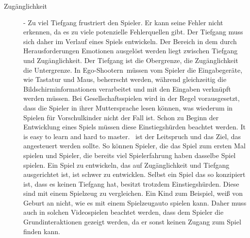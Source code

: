 \begin{description}
\item[Zugänglichkeit] - Zu viel Tiefgang frustriert den Spieler. Er kann seine Fehler nicht erkennen, da es zu viele potenzielle Fehlerquellen gibt. Der Tiefgang muss sich daher im Verlauf eines Spiels entwickeln. Der Bereich in dem durch Herausforderungen Emotionen ausgelöst werden liegt zwischen Tiefgang und Zugänglichkeit. Der Tiefgang ist die Obergrenze, die Zugänglichkeit die Untergrenze. In \glqq Ego-Shootern\grqq\ müssen vom Spieler die Eingabegeräte, wie Tastatur und Maus, beherrscht werden, während gleichzeitig die Bildschirminformationen verarbeitet und mit den Eingaben verknüpft werden müssen. Bei Gesellschaftsspielen wird in der Regel vorausgesetzt, dass die Spieler in ihrer Muttersprache lesen können, was wiederum in Spielen für Vorschulkinder nicht der Fall ist. Schon zu Beginn der Entwicklung eines Spiels müssen diese Einstiegshürden beachtet werden. \glqq It is easy to learn and hard to master.\grqq\ \cite[S. 66]{Adams:1515529} ist der Leitspruch und das Ziel, das angesteuert werden sollte. So können Spieler, die das Spiel zum ersten Mal spielen und Spieler, die bereits viel Spielerfahrung haben dasselbe Spiel spielen. Ein Spiel zu entwickeln, das auf Zugänglichkeit und Tiefgang ausgerichtet ist, ist schwer zu entwicklen.  \cite[S. 66 f.]{Adams:1515529}
Selbst ein Spiel das so konzipiert ist, dass es keinen Tiefgang hat, besitzt trotzdem Einstiegshürden. Diese sind mit einem Spielzeug zu vergleichen. Ein Kind zum Beispiel, weiß von Geburt an nicht, wie es mit einem Spielzeugauto spielen kann. Daher muss auch in solchen Videospielen beachtet werden, dass dem Spieler die Grundinteraktionen gezeigt werden, da er sonst keinen Zugang zum Spiel finden kann. \cite[S. 68]{Adams:1515529}





\end{description}

